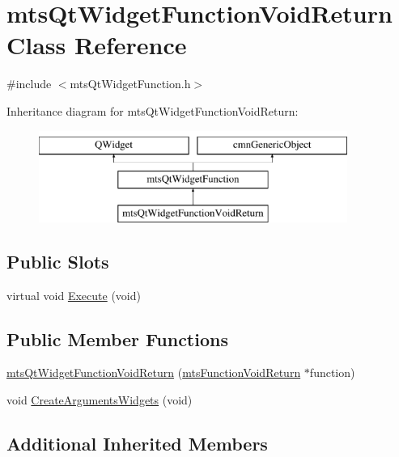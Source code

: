 \hypertarget{classmts_qt_widget_function_void_return}{}\section{mts\+Qt\+Widget\+Function\+Void\+Return Class Reference}
\label{classmts_qt_widget_function_void_return}


{\ttfamily \#include $<$mts\+Qt\+Widget\+Function.\+h$>$}

Inheritance diagram for mts\+Qt\+Widget\+Function\+Void\+Return\+:\begin{figure}[H]
\begin{center}
\leavevmode
\includegraphics[height=3.000000cm]{de/daa/classmts_qt_widget_function_void_return}
\end{center}
\end{figure}
\subsection*{Public Slots}
\begin{DoxyCompactItemize}
\item 
virtual void \hyperlink{classmts_qt_widget_function_void_return_ac05a5c451c222c9b8919930a520bd4e9}{Execute} (void)
\end{DoxyCompactItemize}
\subsection*{Public Member Functions}
\begin{DoxyCompactItemize}
\item 
\hyperlink{classmts_qt_widget_function_void_return_ae526c0e3e406d7c36544a59de610d9f3}{mts\+Qt\+Widget\+Function\+Void\+Return} (\hyperlink{classmts_function_void_return}{mts\+Function\+Void\+Return} $\ast$function)
\item 
void \hyperlink{classmts_qt_widget_function_void_return_ac71dd8453c8b9ee0edc729076cfd7081}{Create\+Arguments\+Widgets} (void)
\end{DoxyCompactItemize}
\subsection*{Additional Inherited Members}


